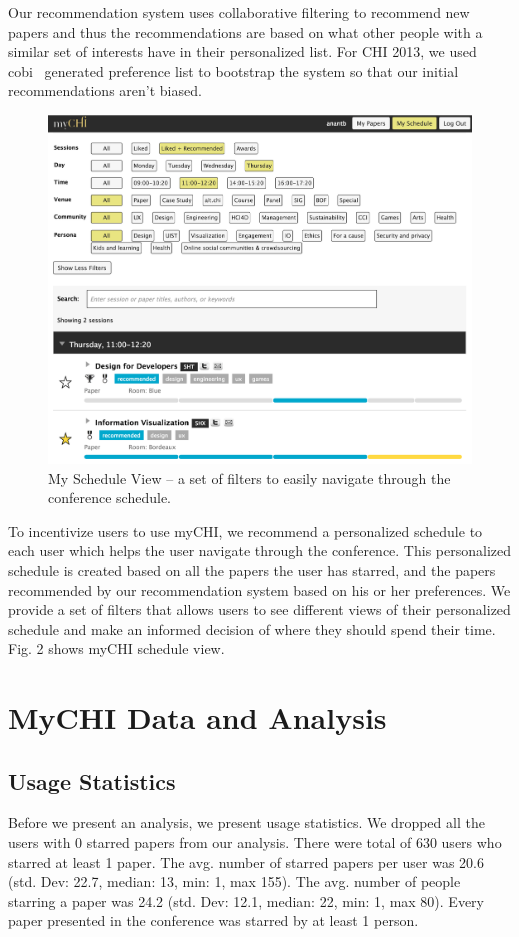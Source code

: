 \documentclass{sigchi}
\begin{document}
Our recommendation system uses collaborative filtering to recommend new papers and thus the recommendations are based on what other people with a similar set of interests have in their personalized list. For CHI 2013, we used cobi~\cite{Zhang:2013:CCL:2468356.2479597} generated preference list to bootstrap the system so that our initial recommendations aren't biased.

\begin{figure}[!h]
\centering
\includegraphics[width=0.9\columnwidth]{mychi-schedule-view}
\caption{My Schedule View -- a set of filters to easily navigate through the conference schedule.}
\label{MyCHI -- My Schedule}
\end{figure}

To incentivize users to use myCHI, we recommend a personalized schedule to each user which helps the user navigate through the conference. This personalized schedule is created based on all the papers the user has starred, and the papers recommended by our recommendation system based on his or her preferences. We provide a set of filters that allows users to see different views of their personalized schedule and make an informed decision of where they should spend their time. Fig. 2 shows myCHI schedule view.


\section{MyCHI Data and Analysis}
\subsection{Usage Statistics}
Before we present an analysis, we present usage statistics. We dropped all the users with 0 starred papers from our analysis. There were total of 630 users who starred at least 1 paper. The avg. number of starred papers per user was 20.6 (std. Dev: 22.7, median: 13,  min: 1, max 155). The avg. number of people starring a paper was 24.2 (std. Dev: 12.1, median: 22,  min: 1, max 80). Every paper presented in the conference was starred by at least 1 person. 
\end{document}
